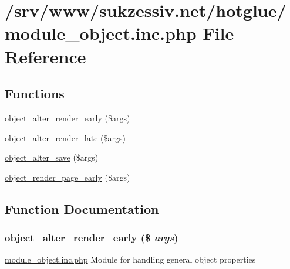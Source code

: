 \hypertarget{module__object_8inc_8php}{
\section{/srv/www/sukzessiv.net/hotglue/module\_\-object.inc.php File Reference}
\label{module__object_8inc_8php}
}
\subsection*{Functions}
\begin{CompactItemize}
\item 
\hyperlink{module__object_8inc_8php_6acc3273ff9872e01527162375d318d8}{object\_\-alter\_\-render\_\-early} (\$args)
\item 
\hyperlink{module__object_8inc_8php_6b5bf16a15b7d5809bd7c6d15cd05a52}{object\_\-alter\_\-render\_\-late} (\$args)
\item 
\hyperlink{module__object_8inc_8php_ba3a00b339dc7e9831b48a94f4f8e211}{object\_\-alter\_\-save} (\$args)
\item 
\hyperlink{module__object_8inc_8php_d06c13f1778d655f4a011d1763c6e618}{object\_\-render\_\-page\_\-early} (\$args)
\end{CompactItemize}


\subsection{Function Documentation}
\hypertarget{module__object_8inc_8php_6acc3273ff9872e01527162375d318d8}{
\subsubsection[{object\_\-alter\_\-render\_\-early}]{\setlength{\rightskip}{0pt plus 5cm}object\_\-alter\_\-render\_\-early (\$ {\em args})}}
\label{module__object_8inc_8php_6acc3273ff9872e01527162375d318d8}


\hyperlink{module__object_8inc_8php}{module\_\-object.inc.php} Module for handling general object properties

